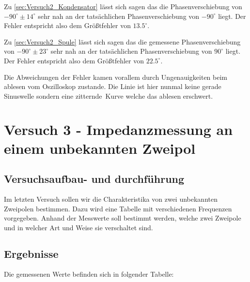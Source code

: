                 \noindent Zu \ref{sec:Versuch2_Kondensator} lässt sich sagen das die Phasenverschiebung von $-90^{\circ} \pm 14^{\circ}$ sehr nah an der tatsächlichen Phasenverschiebung von $-90^{\circ}$ liegt. Der Fehler entspricht also dem Größtfehler von $13.5^{\circ}$.

                \noindent Zu \ref{sec:Versuch2_Spule} lässt sich sagen das die gemessene Phasenverschiebung von $-90^{\circ} \pm 23^{\circ}$ sehr nah an der tatsächlichen Phasenverschiebung von $90^{\circ}$ liegt. Der Fehler entspricht also dem Größtfehler von $22.5^{\circ}$. 

                \noindent Die Abweichungen der Fehler kamen vorallem durch Ungenauigkeiten beim ablesen vom Oszilloskop zustande. Die Linie ist hier nunmal keine gerade Sinuswelle sondern eine \glqq zitternde\grqq\ Kurve welche das ablesen erschwert. 

\section{Versuch 3 - Impedanzmessung an einem unbekannten Zweipol}
    
    \subsection{Versuchsaufbau- und durchführung}

        Im letzten Versuch sollen wir die Charakteristika von zwei unbekannten Zweipolen bestimmen. Dazu wird eine Tabelle mit verschiedenen Frequenzen vorgegeben. Anhand der Messwerte soll bestimmt werden, welche zwei Zweipole und in welcher Art und Weise sie verschaltet sind.

    \subsection{Ergebnisse}
    
        Die gemessenen Werte befinden sich in folgender Tabelle:

